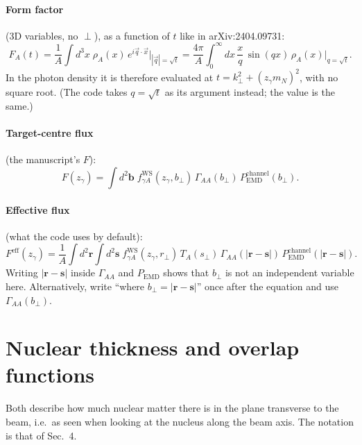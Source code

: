 \documentclass[11pt]{article}
\begin{document}
\paragraph{Form factor} (3D variables, no $\perp$), as a function of $t$ like in
arXiv:2404.09731:
\begin{equation}
  F_A(t)=\frac{1}{A}\int d^3x\;\rho_A(x)\,e^{i\vec q\cdot\vec x}\Big|_{|\vec q|=\sqrt t}
  =\frac{4\pi}{A}\int_0^\infty dx\,\frac{x}{q}\,\sin(qx)\,\rho_A(x)\Big|_{q=\sqrt t}.
\end{equation}
In the photon density it is therefore evaluated at $t=k_\perp^2+(z_\gamma m_N)^2$, with no square
root. (The code takes $q=\sqrt t$ as its argument instead; the value is the same.)

\paragraph{Target-centre flux} (the manuscript's $F$):
\begin{equation}
  F(z_\gamma)=\int d^2\mathbf b\;f^{\text{WS}}_{\gamma A}(z_\gamma,b_\perp)\,
  \Gamma_{AA}(b_\perp)\,P^{\text{channel}}_{\text{EMD}}(b_\perp).
\end{equation}

\paragraph{Effective flux} (what the code uses by default):
\begin{equation}
  F^{\text{eff}}(z_\gamma)=\frac{1}{A}\int d^2\mathbf r\int d^2\mathbf s\;
  f^{\text{WS}}_{\gamma A}(z_\gamma,r_\perp)\,T_A(s_\perp)\,
  \Gamma_{AA}(|\mathbf r-\mathbf s|)\,P^{\text{channel}}_{\text{EMD}}(|\mathbf r-\mathbf s|).
\end{equation}
Writing $|\mathbf r-\mathbf s|$ inside $\Gamma_{AA}$ and $P_{\text{EMD}}$ shows that $b_\perp$ is not
an independent variable here. Alternatively, write ``where $b_\perp=|\mathbf r-\mathbf s|$'' once
after the equation and use $\Gamma_{AA}(b_\perp)$.

\section{Nuclear thickness and overlap functions}

Both describe how much nuclear matter there is in the plane transverse to the beam, i.e.\ as seen
when looking at the nucleus along the beam axis. The notation is that of Sec.~4.
\end{document}
